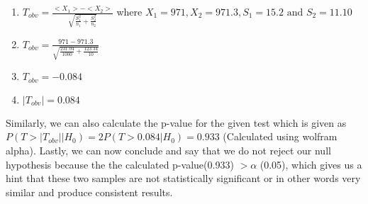 \begin{enumerate}
    \item $T_{obv} = \frac{<X_1> - <X_2>}{\sqrt{\frac{S_1^2}{n_1} + \frac{S_2^2}{n_2}}}$ where $X_1 = 971, X_2 = 971.3, S_1 = 15.2 \text{ and } S_2 = 11.10$ 
     \item $T_{obv} = \frac{971 - 971.3}{\sqrt{\frac{231.04}{1000} + \frac{123.34}{10}}}$
      \item $T_{obv} = - 0.084$
      \item $|T_{obv}| = 0.084$
\end{enumerate}
Similarly, we can also calculate the p-value for the given test which is given as $P(T > |T_{obv}| | H_0) = 2P(T > 0.084 | H_0) = 0.933 $ (Calculated using wolfram alpha). Lastly, we can now conclude and say that we do not reject our null hypothesis because the the calculated p-value(0.933)  $> \alpha$ (0.05), which gives us a hint that these two samples are not statistically significant or in other words very similar and produce consistent results.